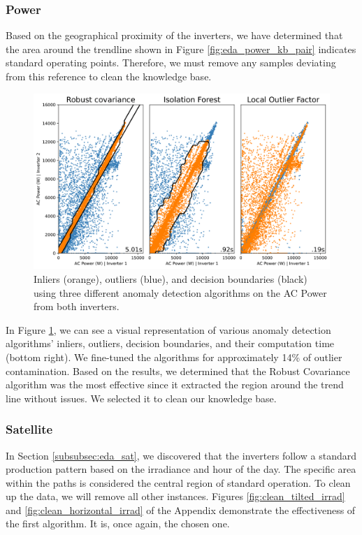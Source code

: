 \subsubsection{Power}

Based on the geographical proximity of the inverters, we have determined that the area around the trendline shown in Figure \ref{fig:eda_power_kb_pair} indicates standard operating points. Therefore, we must remove any samples deviating from this reference to clean the knowledge base.

\begin{figure}[h!]
    \centering
    \includegraphics[width=\textwidth]{figures/chapter5/cleaning/20_cleaning_power-1.png}
    \caption{Inliers (orange), outliers (blue), and decision boundaries (black) using three different anomaly detection algorithms on the AC Power from both inverters.}
    \label{fig:clean_power}
\end{figure}

In Figure \ref{fig:clean_power}, we can see a visual representation of various anomaly detection algorithms' inliers, outliers, decision boundaries, and their computation time (bottom right). We fine-tuned the algorithms for approximately 14\% of outlier contamination. Based on the results, we determined that the Robust Covariance algorithm was the most effective since it extracted the region around the trend line without issues. We selected it to clean our knowledge base.

\subsubsection{Satellite}

In Section \ref{subsubsec:eda_sat}, we discovered that the inverters follow a standard production pattern based on the irradiance and hour of the day. The specific area within the paths is considered the central region of standard operation. To clean up the data, we will remove all other instances. Figures \ref{fig:clean_tilted_irrad} and \ref{fig:clean_horizontal_irrad} of the Appendix demonstrate the effectiveness of the first algorithm. It is, once again, the chosen one.

